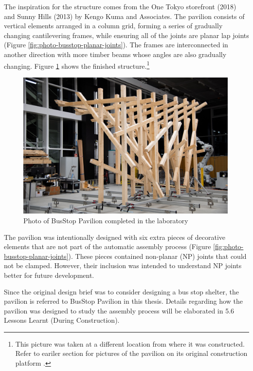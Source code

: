 The inspiration for the structure comes from the One Tokyo storefront (2018) and Sunny Hills (2013) by Kengo Kuma and Associates. The pavilion consists of vertical elements arranged in a column grid, forming a series of gradually changing cantilevering frames, while ensuring all of the joints are planar lap joints (Figure \ref{fig:photo-busstop-planar-joints}). The frames are interconnected in another direction with more timber beams whose angles are also gradually changing.
Figure \ref{fig:photo-busstop-in-rfl} shows the finished structure.\footnote{This picture was taken at a different location from where it was constructed. Refer to eariler section for pictures of the pavilion on its original construction platform .}

\begin{figure}
    \centering
    \includegraphics[width=0.99\textwidth]{images/05/image109.jpg}
    \caption{Photo of BusStop Pavilion completed in the laboratory}
    \label{fig:photo-busstop-in-rfl}
\end{figure}

The pavilion was intentionally designed with six extra pieces of decorative elements that are not part of the automatic assembly process (Figure \ref{fig:photo-busstop-planar-joints}). These pieces contained non-planar (NP) joints that could not be clamped. However, their inclusion was intended to understand NP joints better for future development.
 
Since the original design brief was to consider designing a bus stop shelter, the pavilion is referred to BusStop Pavilion in this thesis. Details regarding how the pavilion was designed to study the assembly process will be elaborated in 5.6 Lessons Learnt (During Construction).

